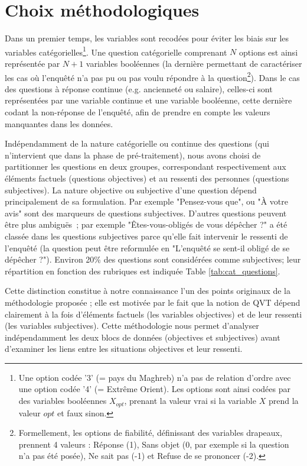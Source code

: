 \documentclass[11pt,fleqn,openany,frenchb]{book} %
\begin{document}
\section{Choix méthodologiques}
    	Dans un premier temps, les variables sont recodées pour éviter les biais sur les variables catégorielles\footnote{Une option codée '3' (= pays du Maghreb) n'a pas de relation d'ordre avec une option codée '4' (= Extrême Orient). Les options sont ainsi codées par des variables booléennes $X_{opt}$, prenant la valeur vrai
si la variable $X$ prend la valeur $opt$ et faux sinon.}. Une question catégorielle comprenant $N$ options est ainsi représentée par $N+1$ variables booléennes (la dernière permettant de caractériser les cas où l'enquêté n'a pas pu ou pas voulu répondre à la question\footnote{Formellement, les options de fiabilité, définissant des variables drapeaux, prennent 4 valeurs : Réponse (1), Sans objet (0, par exemple si la question n'a pas été posée), Ne sait pas (-1) et Refuse de se prononcer (-2). }).
Dans le cas des questions à réponse continue (e.g. ancienneté ou salaire), celles-ci sont représentées par une variable continue et une variable booléenne, cette dernière codant la non-réponse de l'enquêté, afin de prendre en compte les valeurs manquantes dans les données.\par

Indépendamment de la nature catégorielle ou continue des questions (qui n'intervient que dans la phase de pré-traitement), nous avons choisi de partitionner les questions en deux groupes, correspondant respectivement aux éléments factuels (questions objectives) et au ressenti des personnes (questions subjectives). La nature objective ou subjective d'une question dépend principalement de sa formulation. Par  exemple "Pensez-vous que", ou "\`A votre avis" sont des marqueurs de questions subjectives.   D'autres questions peuvent être plus ambiguës~; par exemple "Êtes-vous-obligés de vous dépêcher ?" a été classée dans les questions subjectives parce qu'elle fait intervenir le ressenti de l'enquêté (la question peut être reformulée en "L'enquêté se sent-il obligé de se dépêcher ?"). Environ 20\% des questions sont considérées comme subjectives; leur répartition en fonction des rubriques 
est indiquée Table \ref{tab:cat_questions}. \par

Cette distinction constitue à notre connaissance l'un des points originaux de la méthodologie proposée ; elle est motivée par le fait que la notion de QVT dépend clairement à la fois d'éléments factuels (les variables objectives) et de leur ressenti (les variables subjectives).  
Cette méthodologie nous permet d'analyser indépendamment les deux blocs de données (objectives et subjectives) avant d'examiner les liens entre les situations objectives et leur ressenti. \par
\end{document}
